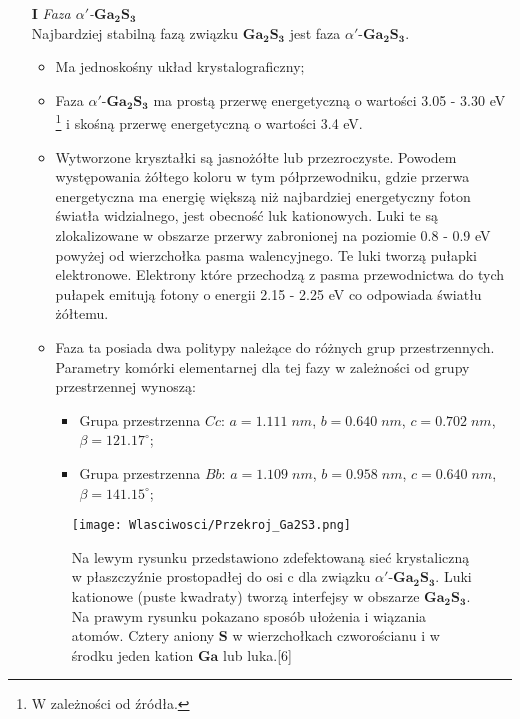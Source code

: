 \begin{enumerate}
	\item[\textbf{I}] \textit{Faza $\alpha'$-$\mathbf{Ga_{2}S_{3}}$} \\
	Najbardziej stabilną fazą związku $\mathbf{Ga_{2}S_{3}}$ jest faza $\alpha'$-$\mathbf{Ga_{2}S_{3}}$.
	\begin{itemize}
		\item Ma jednoskośny układ krystalograficzny;
		\item Faza $\alpha'$-$\mathbf{Ga_{2}S_{3}}$ ma prostą przerwę energetyczną o wartości 3.05 - 3.30 eV \footnote{W zależności od źródła.} i skośną przerwę energetyczną o wartości 3.4 eV.
		\item Wytworzone kryształki są jasnożółte lub przezroczyste. Powodem występowania żółtego koloru w tym półprzewodniku, gdzie przerwa energetyczna ma energię większą niż najbardziej energetyczny foton światła widzialnego, jest obecność luk kationowych. Luki te są zlokalizowane w obszarze przerwy zabronionej na poziomie 0.8 - 0.9 eV powyżej od wierzchołka pasma walencyjnego. Te luki tworzą pułapki elektronowe. Elektrony które przechodzą z pasma przewodnictwa do tych pułapek emitują fotony o energii 2.15 - 2.25 eV co odpowiada światłu żółtemu.
		\item Faza ta posiada dwa politypy należące do różnych grup przestrzennych. Parametry komórki elementarnej dla tej fazy w zależności od grupy przestrzennej wynoszą:
		\begin{itemize}
			\item Grupa przestrzenna $Cc$: $a=1.111\;nm$, $b=0.640\;nm$, $c=0.702\;nm$, $\beta=121.17^{\circ}$;
			\item Grupa przestrzenna $Bb$: $a=1.109\;nm$, $b=0.958\;nm$, $c=0.640\;nm$, $\beta=141.15^{\circ}$;
		\end{itemize}
	\end{itemize} 
	
	\begin{figure}[H]
		\begin{center}
			\texttt{[image: Wlasciwosci/Przekroj\_Ga2S3.png]}
			\caption{Na lewym rysunku przedstawiono zdefektowaną sieć krystaliczną w płaszczyźnie prostopadłej do osi c dla związku $\alpha'$-$\mathbf{Ga_{2}S_{3}}$. Luki kationowe (puste kwadraty) tworzą interfejsy w obszarze $\mathbf{Ga_{2}S_{3}}$. Na prawym rysunku pokazano sposób ułożenia i wiązania atomów. Cztery aniony $\mathbf{S}$ w wierzchołkach czworościanu i w środku jeden kation $\mathbf{Ga}$ lub luka.[6]}
		\end{center}
	\end{figure}
	

\end{enumerate}
